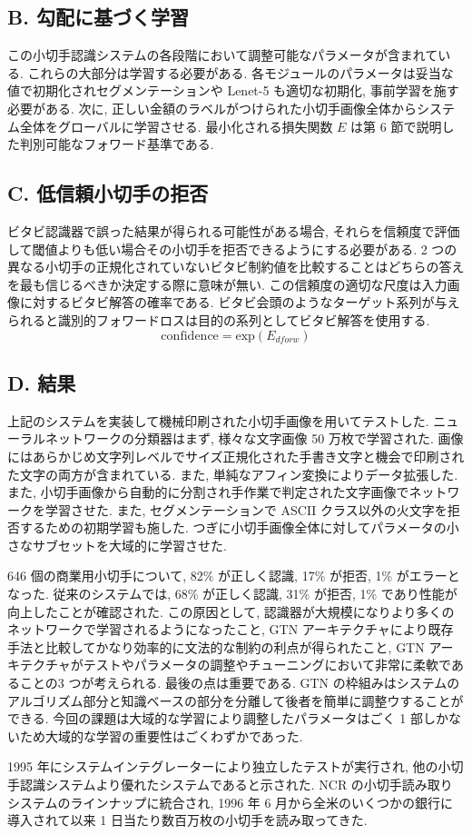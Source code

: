 \documentclass[twocolumn]{jarticle}     %
\begin{document}
\subsection*{B. 勾配に基づく学習}
この小切手認識システムの各段階において調整可能なパラメータが含まれている. これらの大部分は学習する必要がある. 各モジュールのパラメータは妥当な値で初期化されセグメンテーションや Lenet-5 も適切な初期化, 事前学習を施す必要がある. 次に, 正しい金額のラベルがつけられた小切手画像全体からシステム全体をグローバルに学習させる. 
最小化される損失関数 $E$ は第 6 節で説明した判別可能なフォワード基準である.

\subsection*{C. 低信頼小切手の拒否}
ビタビ認識器で誤った結果が得られる可能性がある場合, それらを信頼度で評価して閾値よりも低い場合その小切手を拒否できるようにする必要がある. 2 つの異なる小切手の正規化されていないビタビ制約値を比較することはどちらの答えを最も信じるべきか決定する際に意味が無い. この信頼度の適切な尺度は入力画像に対するビタビ解答の確率である. ビタビ会頭のようなターゲット系列が与えられると識別的フォワードロスは目的の系列としてビタビ解答を使用する. 
\begin{equation*}
  \mathrm{confidence} = \mathrm{exp}(E_{dforw})
\end{equation*}

\subsection*{D. 結果}
上記のシステムを実装して機械印刷された小切手画像を用いてテストした. ニューラルネットワークの分類器はまず, 様々な文字画像 50 万枚で学習された. 画像にはあらかじめ文字列レベルでサイズ正規化された手書き文字と機会で印刷された文字の両方が含まれている. また, 単純なアフィン変換によりデータ拡張した. また, 小切手画像から自動的に分割され手作業で判定された文字画像でネットワークを学習させた. また, セグメンテーションで ASCII クラス以外の火文字を拒否するための初期学習も施した. 
つぎに小切手画像全体に対してパラメータの小さなサブセットを大域的に学習させた. 
\par
646 個の商業用小切手について, 82\% が正しく認識, 17\% が拒否, 1\% がエラーとなった. 
従来のシステムでは, 68\% が正しく認識, 31\% が拒否, 1\% であり性能が向上したことが確認された.
この原因として, 認識器が大規模になりより多くのネットワークで学習されるようになったこと, GTN アーキテクチャにより既存手法と比較してかなり効率的に文法的な制約の利点が得られたこと,  GTN アーキテクチャがテストやパラメータの調整やチューニングにおいて非常に柔軟であることの3 つが考えられる. 最後の点は重要である. GTN の枠組みはシステムのアルゴリズム部分と知識ベースの部分を分離して後者を簡単に調整ウすることができる. 今回の課題は大域的な学習により調整したパラメータはごく 1 部しかないため大域的な学習の重要性はごくわずかであった. \par
1995 年にシステムインテグレーターにより独立したテストが実行され, 他の小切手認識システムより優れたシステムであると示された. NCR の小切手読み取りシステムのラインナップに統合され, 1996 年 6 月から全米のいくつかの銀行に導入されて以来 1 日当たり数百万枚の小切手を読み取ってきた. 
\end{document}

